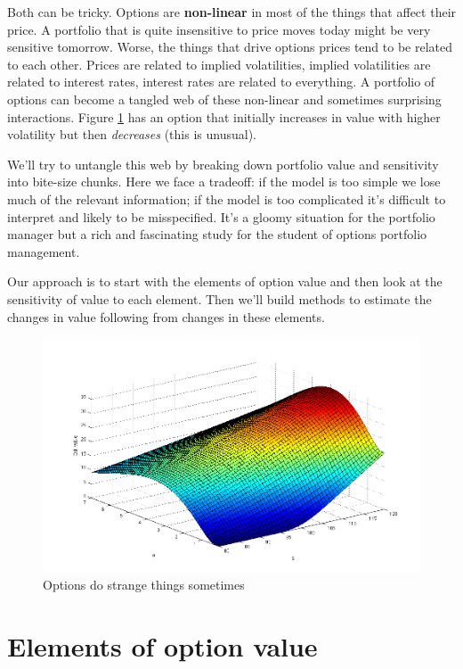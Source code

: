 Both can be tricky. Options are \textbf{non-linear} in most of the things that affect their price. A portfolio that is quite insensitive to price moves today might be very sensitive tomorrow. Worse, the things that drive options prices tend to be related to each other. Prices are related to implied volatilities, implied volatilities are related to interest rates, interest rates are related to everything. A portfolio of options can become a tangled web of these non-linear and sometimes surprising interactions. Figure \ref{strangeOption} has an option that initially increases in value with higher volatility but then \textit{decreases} (this is unusual).

We'll try to untangle this web by breaking down portfolio value and sensitivity into bite-size chunks. Here we face a tradeoff: if the model is too simple we lose much of the relevant information; if the model is  too complicated it's difficult to interpret and likely to be misspecified. It's a gloomy situation for the portfolio manager but a rich and fascinating study for the student of options portfolio management.

Our approach is to start with the elements of option value and then look at the sensitivity of value to each element. Then we'll build methods to estimate the changes in value following from changes in these elements.

\begin{figure}
\includegraphics[width=5in]{pics/strangeOption.png}
\caption{Options do strange things sometimes}
\label{strangeOption}
\end{figure}

\section{Elements of option value}

